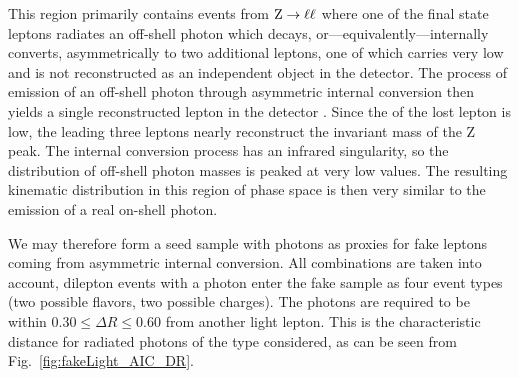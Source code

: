 This region primarily contains events from $\mathrm{Z} \to \ell\ell$ where one of the final state leptons radiates an off-shell photon which decays, or\hairspace---\hairspace{}equivalently\hairspace---\hairspace{}internally converts, asymmetrically to two additional leptons, one of which carries very low \pt and is not reconstructed as an independent object in the detector. The process of emission of an off-shell photon through asymmetric internal conversion then yields a single reconstructed lepton in the detector \cite{Gray:2011us}. Since the \pt of the lost lepton is low, the leading three leptons nearly reconstruct the invariant mass of the Z peak. The internal conversion process has an infrared singularity, so the distribution of off-shell photon masses is peaked at very low values. The resulting kinematic distribution in this region of phase space is then very similar to the emission of a real on-shell photon. 

We may therefore form a seed sample with photons as proxies for fake leptons coming from asymmetric internal conversion. All combinations are taken into account, \ie dilepton events with a photon enter the fake sample as four event types (two possible flavors, two possible charges). The photons are required to be within $0.30 \leq \Delta R \leq 0.60$ from another light lepton. This is the characteristic distance for radiated photons of the type considered, as can be seen from Fig.~\ref{fig:fakeLight_AIC_DR}.

